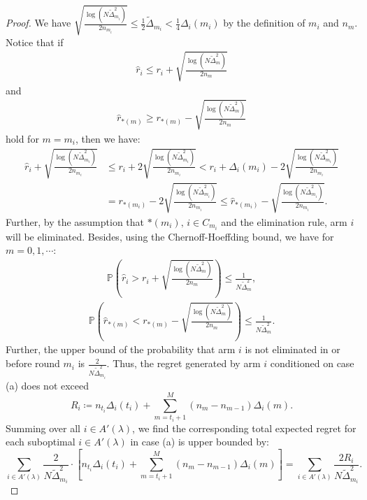 \documentclass[
  12pt]{article}
\begin{document}
\begin{proof}
We have  \( \sqrt{\frac{\log(N \tilde{\Delta}_{m_i}^2)}{2n_{m_i}}} \leq \frac{1}{2}\tilde{\Delta}_{m_i} < \frac{1}{4}\Delta_i(m_i) \) by the definition of $m_i$ and $n_m$. Notice that if
\begin{align}
    \hat{r}_i \leq r_i + \sqrt{\frac{\log(N \tilde{\Delta}_{m}^2)}{2n_{m}}} \label{suboptimal is bad}
\end{align}
and  
\begin{align}
    \hat{r}_{*(m)} \geq r_{*(m)} - \sqrt{\frac{\log(N \tilde{\Delta}_{m}^2)}{2n_{m}}} \label{optimal is good}
\end{align}
hold for $m = m_i$, then we have:  
\begin{align*}
    \hat{r}_i + \sqrt{\frac{\log(N \tilde{\Delta}_{m_i}^2)}{2n_{m_i}}} &\leq r_i + 2\sqrt{\frac{\log(N \tilde{\Delta}_{m_i}^2)}{2n_{m_i}}} < r_i + \Delta_i(m_i) - 2\sqrt{\frac{\log(N \tilde{\Delta}_{m_i}^2)}{2n_{m_i}}} \\
    &= r_{*(m_i)} - 2\sqrt{\frac{\log(N \tilde{\Delta}_{m_i}^2)}{2n_{m_i}}} \leq \hat{r}_{*(m_i)} - \sqrt{\frac{\log(N \tilde{\Delta}_{m_i}^2)}{2n_{m_i}}}.
\end{align*}
Further, by the assumption that $*(m_i),\, i \in C_{m_i}$ and the elimination rule, arm \( i \) will be eliminated. Besides, using the Chernoff-Hoeffding bound, we have for $m=0,1,\cdots$:
\begin{align}
    \mathbb{P}\left( \hat{r}_i > r_i + \sqrt{\frac{\log(N \tilde{\Delta}_{m}^2)}{2n_{m}}} \right) \leq \frac{1}{N \tilde{\Delta}_{m}^2},
\end{align}
\begin{align}
    \mathbb{P}\left( \hat{r}_{*(m)} < r_{*(m)} - \sqrt{\frac{\log(N \tilde{\Delta}_{m}^2)}{2n_{m}}} \right) \leq \frac{1}{N \tilde{\Delta}_{m}^2} .
\end{align}
Further, the upper bound of the probability that arm \( i \) is not eliminated in or before round $m_i$ is \( \frac{2}{N \tilde{\Delta}_{m_i}^2} \). Thus, the regret generated by arm \( i \) conditioned on case (a) does not exceed
\[
R_i \coloneqq  n_{t_i}\Delta_i(t_i) + \sum_{m = t_i + 1}^{M} (n_m - n_{m-1})\Delta_i(m).
\]
Summing over all $i\in A'(\lambda)$, we find the corresponding total expected regret for each suboptimal $i\in A'(\lambda)$ in case (a) is upper bounded by:
\[\sum_{i\in A'(\lambda)}\frac{2}{N \tilde{\Delta}_{m_i}^2}\cdot\left[n_{t_i}\Delta_i(t_i) + \sum_{m = t_i + 1}^{M} (n_m - n_{m-1})\Delta_i(m)\right]=\sum_{i\in A'(\lambda)}\frac{2R_i}{N\tilde{\Delta}_{m_i}^2}.\]


\end{proof}
\end{document}
